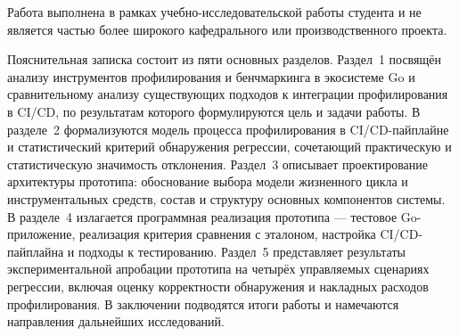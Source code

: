 Работа выполнена в рамках учебно-исследовательской работы студента и не
является частью более широкого кафедрального или производственного
проекта.

Пояснительная записка состоит из пяти основных разделов. Раздел~1
посвящён анализу инструментов профилирования и бенчмаркинга в экосистеме
Go и сравнительному анализу существующих подходов к интеграции
профилирования в CI/CD, по результатам которого формулируются цель и
задачи работы. В разделе~2 формализуются модель процесса профилирования в
CI/CD-пайплайне и статистический критерий обнаружения регрессии,
сочетающий практическую и статистическую значимость отклонения. Раздел~3
описывает проектирование архитектуры прототипа: обоснование выбора модели
жизненного цикла и инструментальных средств, состав и структуру основных
компонентов системы. В разделе~4 излагается программная реализация
прототипа — тестовое Go-приложение, реализация критерия сравнения с
эталоном, настройка CI/CD-пайплайна и подходы к тестированию. Раздел~5
представляет результаты экспериментальной апробации прототипа на четырёх
управляемых сценариях регрессии, включая оценку корректности обнаружения
и накладных расходов профилирования. В заключении подводятся итоги работы
и намечаются направления дальнейших исследований.
